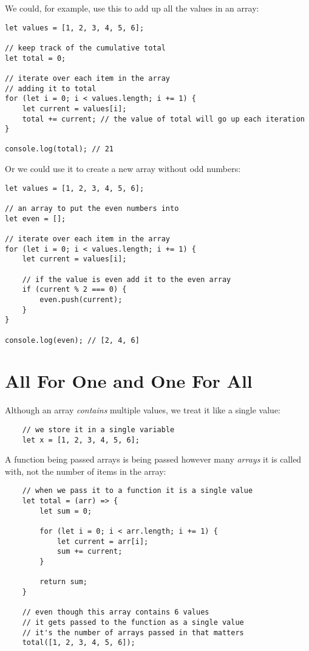 \pagebreak

We could, for example, use this to add up all the values in an array:

\begin{verbatim}
let values = [1, 2, 3, 4, 5, 6];

// keep track of the cumulative total
let total = 0;

// iterate over each item in the array
// adding it to total
for (let i = 0; i < values.length; i += 1) {
    let current = values[i];
    total += current; // the value of total will go up each iteration
}

console.log(total); // 21
\end{verbatim}


Or we could use it to create a new array without odd numbers:

\begin{verbatim}
let values = [1, 2, 3, 4, 5, 6];

// an array to put the even numbers into
let even = [];

// iterate over each item in the array
for (let i = 0; i < values.length; i += 1) {
    let current = values[i];

    // if the value is even add it to the even array
    if (current % 2 === 0) {
        even.push(current);
    }
}

console.log(even); // [2, 4, 6]
\end{verbatim}

\pagebreak

\section{All For One and One For All}

Although an array \textit{contains} multiple values, we treat it like a single value:

\begin{verbatim}
    // we store it in a single variable
    let x = [1, 2, 3, 4, 5, 6];
\end{verbatim}

A function being passed arrays is being passed however many \textit{arrays} it is called with, not the number of items in the array:

\begin{verbatim}
    // when we pass it to a function it is a single value
    let total = (arr) => {
        let sum = 0;

        for (let i = 0; i < arr.length; i += 1) {
            let current = arr[i];
            sum += current;
        }

        return sum;
    }

    // even though this array contains 6 values
    // it gets passed to the function as a single value
    // it's the number of arrays passed in that matters
    total([1, 2, 3, 4, 5, 6]);
\end{verbatim}

